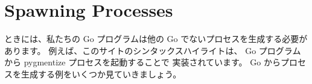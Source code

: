\section{Spawning Processes}

ときには、私たちの Go プログラムは他の Go でないプロセスを生成する必要があります。 例えば、このサイトのシンタックスハイライトは、 Go プログラムから pygmentize プロセスを起動することで 実装されています。 Go からプロセスを生成する例をいくつか見ていきましょう。




